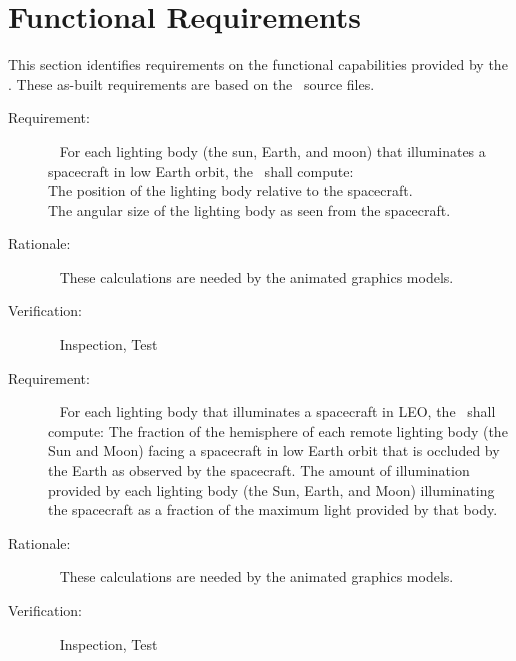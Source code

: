 \section{Functional Requirements}\label{sec:func_reqts}
This section identifies requirements on the functional
capabilities provided by the \earthlightingDesc.
These as-built requirements are based on the \earthlightingDesc\ source files.

\label{reqt:func_calc_lighting_bodies}
\begin{description}
  \item[Requirement:]\ \newline
    For each lighting body (the sun, Earth, and moon)
    that illuminates a spacecraft in low Earth orbit,
    the \earthlightingDesc\ shall compute:
  \label{reqt:lighting_body_position}
\\  The position of the lighting body relative to
    the spacecraft.
  \label{reqt:lighting_body_size}
    \\ The angular size of the lighting body
    as seen from the spacecraft.

  \item[Rationale:]\ \newline
    These calculations are needed by the animated graphics models.

  \item[Verification:]\ \newline
    Inspection, Test
\end{description}

\label{reqt:func_calc_illumination}
\begin{description}
  \item[Requirement:]\ \newline
    For each lighting body that illuminates a spacecraft in LEO, the
    \earthlightingDesc\ shall compute:
    The fraction of the hemisphere of each remote lighting body
    (the Sun and Moon) facing a spacecraft in low Earth orbit
    that is occluded by the Earth as observed by the spacecraft.
    The amount of illumination
    provided by each lighting body (the Sun, Earth, and Moon)
    illuminating the spacecraft
    as a fraction of the maximum light provided by that body.
  \item[Rationale:]\ \newline
    These calculations are needed by the animated graphics models.

  \item[Verification:]\ \newline
    Inspection, Test
\end{description}

